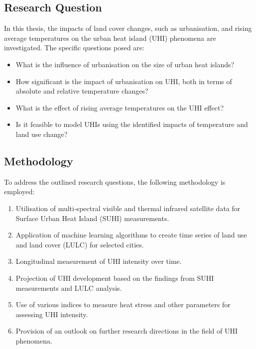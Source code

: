 \documentclass[12pt,a4paper, english]{article}
\begin{document}
\subsection{Research Question}
In this thesis, the impacts of land cover changes, such as urbanisation, and rising average temperatures on the urban heat island (UHI) phenomena are investigated.
The specific questions posed are:
\begin{itemize}
    \item What is the influence of urbanisation on the size of urban heat islands?
    \item How significant is the impact of urbanisation on UHI, both in terms of absolute and relative temperature changes?
    \item What is the effect of rising average temperatures on the UHI effect?
    \item Is it feasible to model UHIs using the identified impacts of temperature and land use change?
\end{itemize}

\subsection{Methodology}
To address the outlined research questions, the following methodology is employed:
\begin{enumerate}
    \item Utilisation of multi-spectral visible and thermal infrared satellite data for Surface Urban Heat Island (SUHI) measurements.
    \item Application of machine learning algorithms to create time series of land use and land cover (LULC) for selected cities. %
    \item Longitudinal measurement of UHI intensity over time.
    \item Projection of UHI development based on the findings from \gls{SUHI} measurements and \gls{LULC} analysis.
    \item Use of various indices to measure heat stress and other parameters for assessing UHI intensity.
    \item Provision of an outlook on further research directions in the field of UHI phenomena.
\end{enumerate}
\end{document}
